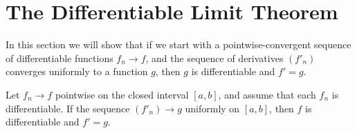 \section{The Differentiable Limit Theorem}
In this section we will show that if we start with a pointwise-convergent sequence of differentiable functions $f_n\rightarrow f$, and the sequence of derivatives  $(f'_n)$ converges uniformly to a function $g$, then $g$ is differentiable and $f'=g$.
\par\vspace{0.5 cm}
\begin{theorem*}  Let $f_n\rightarrow f$ pointwise on the closed interval $[a,b]$, and assume that each $f_n$ is differentiable.  If the sequence $(f'_n)\rightarrow g$ uniformly on $[a,b]$, then $f$ is differentiable and $f'=g$.
\end{theorem*}
